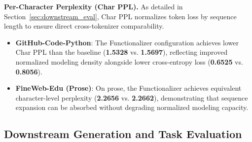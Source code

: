 \documentclass{article}
\begin{document}
\begin{table}[t]
\centering
\caption{Training Dynamics and Language Modeling Metrics ($\sim$98M Parameters, 5 Seeds)}
\label{tab:training}
\end{table}

\textbf{Per-Character Perplexity (Char PPL).} As detailed in Section~\ref{sec:downstream_eval}, Char PPL normalizes token loss by sequence length to ensure direct cross-tokenizer comparability.
\begin{itemize}
    \item \textbf{GitHub-Code-Python}: The Functionalizer configuration achieves lower Char PPL than the baseline (\textbf{1.5328} vs. \textbf{1.5697}), reflecting improved normalized modeling density alongside lower cross-entropy loss (\textbf{0.6525} vs. \textbf{0.8056}).
    \item \textbf{FineWeb-Edu (Prose)}: On prose, the Functionalizer achieves equivalent character-level perplexity (\textbf{2.2656} vs. \textbf{2.2662}), demonstrating that sequence expansion can be absorbed without degrading normalized modeling capacity.
\end{itemize}

\subsection{Downstream Generation and Task Evaluation}\label{sec:results_inference}
\end{document}

